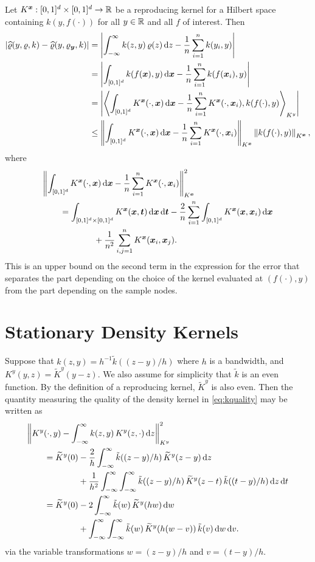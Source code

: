 \documentclass[letterpaper]{amsart}
\newcommand{\hvarrho}{\widehat{\varrho}}
\newcommand{\KY}{K^y}
\newcommand{\tKY}{\widetilde{K}^y}
\newcommand{\KX}{K^{\vx}}
\newcommand{\tk}{\tilde{k}}
\begin{document}
Let $\KX: [0,1]^d \times [0,1]^d\to \reals$ be a reproducing kernel for a Hilbert space containing $k(y,f(\cdot))$ for all $y \in \mathbb{R}$ and all $f$ of interest. Then
\begin{align*}
\abs{\hvarrho(y,\varrho,k) - \hvarrho(y,\varrho_{\vy},k)}
& = \abs{\int_{-\infty}^{\infty} k(z,y) \, \varrho(z) \, \dif z -
\frac 1n \sum_{i=1}^n k(y_i,y)} \\
& = \abs{\int_{[0,1]^d} k(f(\vx),y) \, \dif \vx -
\frac 1n \sum_{i=1}^n k(f(\vx_i),y)} \\
& = \abs{\ip[\KY]{\int_{[0,1]^d} \KX(\cdot,\vx) \, \dif \vx -
\frac 1n \sum_{i=1}^n \KX(\cdot,\vx_i)}{k(f(\cdot),y) }} \\
& \le  \norm[\KX]{\int_{[0,1]^d} \KX(\cdot,\vx) \, \dif \vx -
\frac 1n \sum_{i=1}^n \KX(\cdot,\vx_i)} \norm[\KX]{k(f(\cdot),y) } ,
\end{align*}
where
\begin{align*}
\MoveEqLeft{\norm[\KX]{\int_{[0,1]^d} \KX(\cdot,\vx) \, \dif \vx -
\frac 1n \sum_{i=1}^n \KX(\cdot,\vx_i)}^2} \\
&=  \int_{[0,1]^d \times [0,1]^d} \KX(\vx,\vt) \, \dif \vx \, \dif \vt -
\frac 2n \sum_{i=1}^n \int_{[0,1]^d} \KX(\vx,\vx_i) \, \dif \vx \\
& \qquad \qquad + \frac 1{n^2} \sum_{i,j=1}^n  \KX(\vx_i,\vx_j) .
\end{align*}
This is an upper bound on the second term in the expression for the error that separates the part depending on the choice of the kernel evaluated at $(f(\cdot),y)$ from the part depending on the sample nodes.


\section{Stationary Density Kernels}

Suppose that $k(z,y) = h^{-1}\tk((z-y)/h)$ where $h$ is a bandwidth, and $\KY(y,z) = \tKY(y-z)$.  We also assume for simplicity that $\tk$ is an even function.  By the definition of a reproducing kernel, $\tKY$ is also even. Then the quantity measuring the quality of the density kernel in \eqref{eq:kquality} may be written as
\begin{align*}
	\MoveEqLeft{\norm[\KY]{\KY(\cdot,y) - \int_{-\infty}^{\infty} k(z,y) \, \KY(z,\cdot) \, \dif z}^2} \\
	&=  \tKY(0) -  \frac 2h \int_{-\infty}^{\infty} \tk((z-y)/h) \, \tKY(z-y) \, \dif z \\
	& \qquad \qquad + \frac 1{h^2} \int_{-\infty}^{\infty} \int_{-\infty}^{\infty}  \tk((z-y)/h)  \, \tKY(z-t) \, \tk((t-y)/h) \, \dif z \, \dif t \\
	&=   \tKY(0) - 2 \int_{-\infty}^{\infty} \tk(w) \, \tKY(hw) \, \dif w \\
	& \qquad \qquad + \int_{-\infty}^{\infty} \int_{-\infty}^{\infty}  \tk(w) \, \tKY(h(w-v)) \, \tk(v)\, \dif w \, \dif v
	.
\end{align*}
via the variable transformations $w = (z-y)/h$ and $v = (t-y)/h$.
\end{document}
